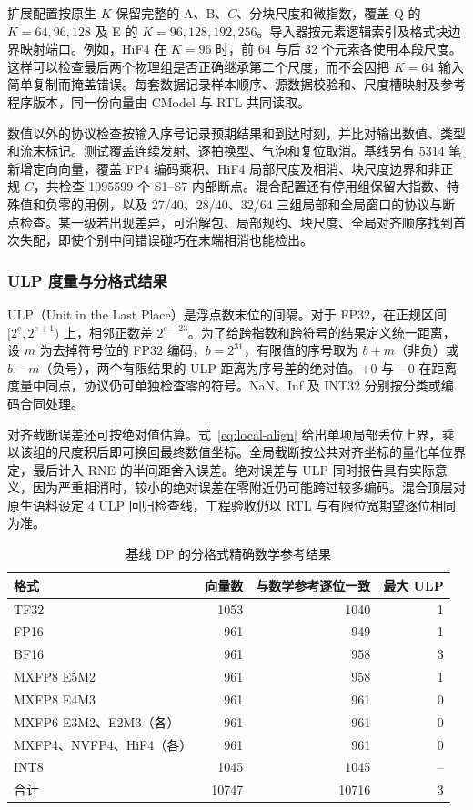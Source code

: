 \documentclass[10.5pt,compsoc,UTF8]{CjC}
\begin{document}
扩展配置按原生 $K$ 保留完整的 A、B、$C$、分块尺度和微指数，覆盖 Q 的 $K=64,96,128$ 及 E 的 $K=96,128,192,256$。导入器按元素逻辑索引及格式块边界映射端口。例如，HiF4 在 $K=96$ 时，前 64 与后 32 个元素各使用本段尺度。这样可以检查最后两个物理组是否正确继承第二个尺度，而不会因把 $K=64$ 输入简单复制而掩盖错误。每套数据记录样本顺序、源数据校验和、尺度槽映射及参考程序版本，同一份向量由 CModel 与 RTL 共同读取。

数值以外的协议检查按输入序号记录预期结果和到达时刻，并比对输出数值、类型和流末标记。测试覆盖连续发射、逐拍换型、气泡和复位取消。基线另有 5314 笔新增定向向量，覆盖 FP4 编码乘积、HiF4 局部尺度及相消、块尺度边界和非正规 $C$，共检查 1095599 个 S1--S7 内部断点。混合配置还有停用组保留大指数、特殊值和负零的用例，以及 27/40、28/40、32/64 三组局部和全局窗口的协议与断点检查。某一级若出现差异，可沿解包、局部规约、块尺度、全局对齐顺序找到首次失配，即使个别中间错误碰巧在末端相消也能检出。

\subsubsection{ULP 度量与分格式结果}

ULP（Unit in the Last Place）是浮点数末位的间隔。对于 FP32，在正规区间 $[2^e,2^{e+1})$ 上，相邻正数差 $2^{e-23}$。为了给跨指数和跨符号的结果定义统一距离，设 $m$ 为去掉符号位的 FP32 编码，$b=2^{31}$，有限值的序号取为 $b+m$（非负）或 $b-m$（负号），两个有限结果的 ULP 距离为序号差的绝对值。$+0$ 与 $-0$ 在距离度量中同点，协议仍可单独检查零的符号。NaN、Inf 及 INT32 分别按分类或编码合同处理。

对齐截断误差还可按绝对值估算。式~\eqref{eq:local-align} 给出单项局部丢位上界，乘以该组的尺度积后即可换回最终数值坐标。全局截断按公共对齐坐标的量化单位界定，最后计入 RNE 的半间距舍入误差。绝对误差与 ULP 同时报告具有实际意义，因为严重相消时，较小的绝对误差在零附近仍可能跨过较多编码。混合顶层对原生语料设定 4 ULP 回归检查线，工程验收仍以 RTL 与有限位宽期望逐位相同为准。

\begin{table}[!htbp]
\centering
\caption{基线 DP 的分格式精确数学参考结果}
\label{tab:numeric-by-format}
\begin{tabular}{@{}lrrr@{}}
\toprule
格式 & 向量数 & 与数学参考逐位一致 & 最大 ULP \\
\midrule
TF32 & 1053 & 1040 & 1 \\
FP16 & 961 & 949 & 1 \\
BF16 & 961 & 958 & 3 \\
MXFP8 E5M2 & 961 & 958 & 1 \\
MXFP8 E4M3 & 961 & 961 & 0 \\
MXFP6 E3M2、E2M3（各） & 961 & 961 & 0 \\
MXFP4、NVFP4、HiF4（各） & 961 & 961 & 0 \\
INT8 & 1045 & 1045 & -- \\
\midrule
合计 & 10747 & 10716 & 3 \\
\bottomrule
\end{tabular}
\end{table}
\end{document}

